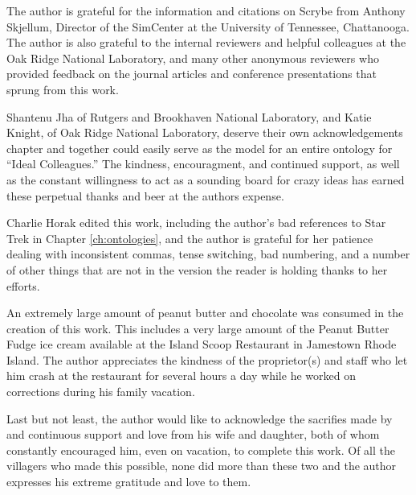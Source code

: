 The author is grateful for the information and citations on Scrybe from Anthony
Skjellum, Director of the SimCenter at the University of Tennessee,
Chattanooga. The author is also grateful to the internal reviewers and helpful
colleagues at the Oak Ridge National Laboratory, and many other anonymous
reviewers who provided feedback on the journal articles and conference
presentations that sprung from this work.

Shantenu Jha of Rutgers and Brookhaven National Laboratory, and Katie Knight, of
Oak Ridge National Laboratory, deserve their own acknowledgements chapter and
together could easily serve as the model for an entire ontology for ``Ideal
Colleagues.'' The kindness, encouragment, and continued support, as well as the
constant willingness to act as a sounding board for crazy ideas has earned these
perpetual thanks and beer at the authors expense.

Charlie Horak edited this work, including the author's bad references to Star
Trek in Chapter \ref{ch:ontologies}, and the author is grateful for her patience
dealing with inconsistent commas, tense switching, bad numbering, and a number
of other things that are not in the version the reader is holding thanks to her
efforts.

An extremely large amount of peanut butter and chocolate was consumed in the
creation of this work. This includes a very large amount of the Peanut Butter
Fudge ice cream available at the Island Scoop Restaurant in Jamestown Rhode
Island. The author appreciates the kindness of the proprietor(s) and staff who
let him crash at the restaurant for several hours a day while he worked on
corrections during his family vacation.

Last but not least, the author would like to acknowledge the sacrifies made by
and continuous support and love from his wife and daughter, both of whom
constantly encouraged him, even on vacation, to complete this work. Of all the
villagers who made this possible, none did more than these two and the author
expresses his extreme gratitude and love to them.
